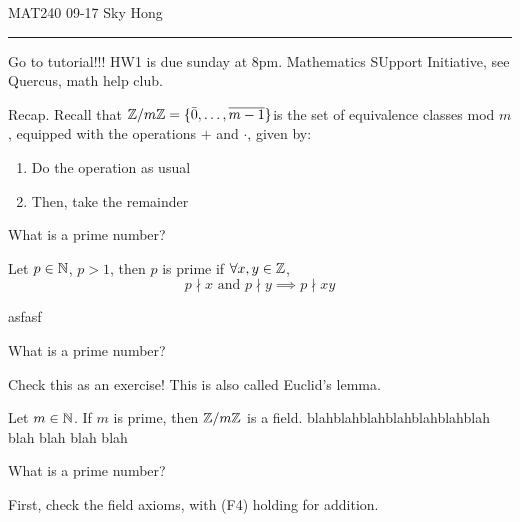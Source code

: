 \documentclass[12pt]{article}
\begin{document}
\noindent MAT240 09-17 \hfill Sky Hong

\hrule


Go to tutorial!!! HW1 is due sunday at 8pm. Mathematics SUpport Initiative, see Quercus, math help club.

Recap. Recall that $\mathbb{Z} / m \mathbb{Z} = \{ \bar{0}, \dots, \overline{m-1} \}$is the set of equivalence classes mod $m$, equipped with the operations $+$ and $\cdot$, given by:
\begin{enumerate}
    \item Do the operation as usual
    \item Then, take the remainder
\end{enumerate}

\begin{remark}
    What is a prime number?
\end{remark}

\begin{defn}
    Let $p \in \mathbb{N}$, $p > 1$, then $p$ is prime if $\forall x,y \in \mathbb{Z}$,\[
        p \nmid x \text{ and } p \nmid y \implies p \nmid xy
    \]
\end{defn}

asfasf
\begin{remark}
    What is a prime number?
\end{remark}

Check this as an exercise! This is also called Euclid's lemma.

\begin{thm}
    Let $m \in \mathbb{N}$. If $m$ is prime, then $\mathbb{Z} / m \mathbb{Z}$ is a field. blahblahblahblahblahblahblah blah blah blah blah
\end{thm}
\begin{remark}
    What is a prime number?
\end{remark}
\begin{pf}
    First, check the field axioms, with (F4) holding for addition.
\end{pf}
\end{document}
